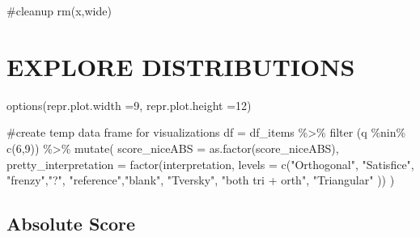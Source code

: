 \documentclass[
  letterpaper,
  DIV=11,
  numbers=noendperiod]{scrreprt}
\newenvironment{Shaded}{\begin{snugshade}}{\end{snugshade}}
\newcommand{\AttributeTok}[1]{\textcolor[rgb]{0.40,0.45,0.13}{#1}}
\newcommand{\CommentTok}[1]{\textcolor[rgb]{0.37,0.37,0.37}{#1}}
\newcommand{\DecValTok}[1]{\textcolor[rgb]{0.68,0.00,0.00}{#1}}
\newcommand{\FunctionTok}[1]{\textcolor[rgb]{0.28,0.35,0.67}{#1}}
\newcommand{\NormalTok}[1]{\textcolor[rgb]{0.00,0.23,0.31}{#1}}
\newcommand{\OtherTok}[1]{\textcolor[rgb]{0.00,0.23,0.31}{#1}}
\newcommand{\SpecialCharTok}[1]{\textcolor[rgb]{0.37,0.37,0.37}{#1}}
\newcommand{\StringTok}[1]{\textcolor[rgb]{0.13,0.47,0.30}{#1}}
\begin{document}
\begin{Shaded}
\begin{Highlighting}[]
\CommentTok{\#cleanup }
\FunctionTok{rm}\NormalTok{(x,wide)}
\end{Highlighting}
\end{Shaded}

\hypertarget{explore-distributions}{%
\section{EXPLORE DISTRIBUTIONS}\label{explore-distributions}}

\begin{Shaded}
\begin{Highlighting}[]
\FunctionTok{options}\NormalTok{(}\AttributeTok{repr.plot.width =}\DecValTok{9}\NormalTok{, }\AttributeTok{repr.plot.height =}\DecValTok{12}\NormalTok{)}

\CommentTok{\#create temp data frame for visualizations}
\NormalTok{df }\OtherTok{=}\NormalTok{ df\_items }\SpecialCharTok{\%\textgreater{}\%} \FunctionTok{filter}\NormalTok{ (q }\SpecialCharTok{\%nin\%} \FunctionTok{c}\NormalTok{(}\DecValTok{6}\NormalTok{,}\DecValTok{9}\NormalTok{)) }\SpecialCharTok{\%\textgreater{}\%} \FunctionTok{mutate}\NormalTok{(}
  \AttributeTok{score\_niceABS =} \FunctionTok{as.factor}\NormalTok{(score\_niceABS),}
  \AttributeTok{pretty\_interpretation =} \FunctionTok{factor}\NormalTok{(interpretation,}
    \AttributeTok{levels =} \FunctionTok{c}\NormalTok{(}\StringTok{"Orthogonal"}\NormalTok{, }\StringTok{"Satisfice"}\NormalTok{, }
               \StringTok{"frenzy"}\NormalTok{,}\StringTok{"?"}\NormalTok{,}
                \StringTok{"reference"}\NormalTok{,}\StringTok{"blank"}\NormalTok{,}
                \StringTok{"Tversky"}\NormalTok{, }\StringTok{"both tri + orth"}\NormalTok{,}
               \StringTok{"Triangular"}\NormalTok{ ))}
\NormalTok{  )}
\end{Highlighting}
\end{Shaded}

\hypertarget{absolute-score}{%
\subsection{Absolute Score}\label{absolute-score}}
\end{document}
